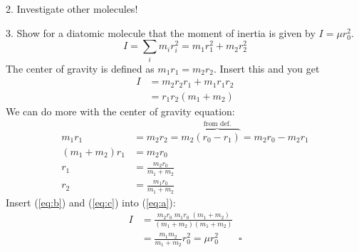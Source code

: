 \documentclass[paper=a4, fontsize=11pt]{scrartcl}
\begin{document}
2. Investigate other molecules!

3. Show for a diatomic molecule that the moment of inertia is given by $I = \mu r_0^2$.
\begin{equation*}
  I = \sum_i m_i r_i^2 = m_1 r_1^2 + m_2 r_2^2
\end{equation*}
The center of gravity is defined as $m_1 r_1 = m_2 r_2$. Insert this and you get
\begin{align}
  I &= m_2 r_2 r_1 + m_1 r_1 r_2 \nonumber\\
    &= r_1 r_2 (m_1 + m_2) \label{eq:a}
\end{align}
We can do more with the center of gravity equation:
\begin{align}
  m_1 r_1 &= m_2 r_2 = m_2 \overbrace{(r_0 - r_1)}^\text{from def.} = m_2 r_0 - m_2 r_1 \nonumber\\
  (m_1 + m_2) r_1 &= m_2 r_0 \nonumber\\
  r_1 &= \frac{m_2 r_0}{m_1 + m_2} \label{eq:b}\\
  r_2 &= \frac{m_1 r_0}{m_1 + m_2} \label{eq:c}
\end{align}
Insert (\ref{eq:b}) and (\ref{eq:c}) into (\ref{eq:a}):
\begin{align*}
  I &= \frac{m_2r_0 \; m_1r_0 \; (m_1 + m_2)}{(m_1 + m_2)(m_1 + m_2)} \\
    &= \frac{m_1m_2}{m_1 + m_2} r_0^2 = \mu r_0^2 \qquad\square
\end{align*}
\end{document}
